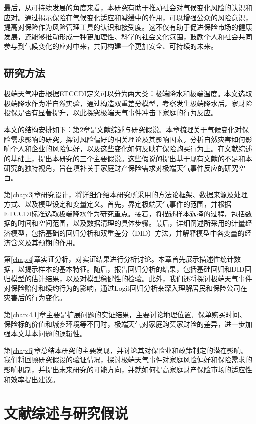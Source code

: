 最后，从可持续发展的角度来看，本研究有助于推动社会对气候变化风险的认识和应对。通过揭示保险在气候变化适应和减缓中的作用，可以增强公众的风险意识，提高对保险作为风险管理工具的认识和接受度。这不仅有助于促进保险市场的健康发展，还能够推动形成一种更加理性、科学的社会文化氛围，鼓励个人和社会共同参与到气候变化的应对中来，共同构建一个更加安全、可持续的未来。

\section{研究方法}
极端天气冲击根据ETCCDI\citep{alexander2006global}定义可以分为两大类：极端降水和极端温度。本文选取极端降水作为准自然实验，通过构造双重差分模型，考察发生极端降水后，家财险投保是否有显著提升，以此探究极端天气事件冲击下家庭的行为反应。

本文的结构安排如下：第\ref{chap:2}章是文献综述与研究假说。本章梳理关于气候变化对保险需求影响的研究，探讨风险偏好的相关理论及其影响因素，分析自然灾害如何影响个人和企业的风险偏好，以及这些变化如何反映在保险购买行为上。在文献综述的基础上，提出本研究的三个主要假说。这些假说的提出基于现有文献的不足和本研究的独特视角，旨在填补关于家庭财产保险需求对极端天气事件反应的研究空白。

第\ref{chap:3}章研究设计，将详细介绍本研究所采用的方法论框架、数据来源及处理方式、以及模型设定和变量定义。首先，界定极端天气事件的范围，并根据ETCCDI标准选取极端降水作为研究重点。接着，将描述样本选择的过程，包括数据的时间和空间范围，以及数据清理的具体步骤。最后，详细阐述所采用的计量经济模型，包括基础的回归分析和双重差分（DID）方法，并解释模型中各变量的经济含义及其预期的作用。

第\ref{chap:4}章实证分析，对实证结果进行分析讨论。本章首先展示描述性统计数据，以揭示样本的基本特征。随后，报告回归分析的结果，包括基础回归和DID回归模型的估计结果，以及对模型稳健性的检验。此外，我们还将探讨极端天气事件对保险赔付和续约行为的影响，通过Logit回归分析来深入理解居民和保险公司在灾害后的行为变化。

第\ref{chap:4.1}章主要是扩展问题的实证结果，主要讨论地理位置、保单购买时间、保险标的价值和城乡环境等不同时，极端天气对家庭购买家财险的差异，进一步加强本文基本问题的逻辑性。

第\ref{chap:5}章总结本研究的主要发现，并讨论其对保险业和政策制定的潜在影响。我们将回顾研究假设的验证情况，探讨极端天气事件对家庭风险偏好和保险需求的影响机制，并提出未来研究的可能方向，并就如何提高家庭财产保险市场的适应性和效率提出建议。

\chapter{文献综述与研究假说}\label{chap:2}
